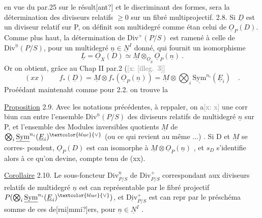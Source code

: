 \documentclass[11pt]{article}
\newcommand{\scanpage}[1]{\par\bigskip\noindent{\small\sffamily[scan #1]}\par}
\newcommand{\mspage}[1]{{\small\sffamily[p.\,#1]}}
\newcommand{\hand}[1]{\textcolor{blue}{#1}}
\newcommand{\xout}[1]{\textcolor{gray}{[\textsf{x:} #1]}}
\newcommand{\uline}[1]{\underline{#1}}
\newcommand{\unsure}[1]{[#1?]}
\newcommand{\illegible}[1]{[\textsf{illeg.\ #1}]}
\begin{document}
\mspage{108}

\clearpage
\scanpage{25/109}
\mspage{12}

en vue du par.25 sur le résult\unsure{ant} et le discriminant des formes, sera la
détermination des diviseurs relatifs $\geqslant 0$ sur un fibré multiprojectif.
2.8.
Si $\underline{D}$ est un diviseur relatif sur P, on définit son multidegré comme étan
celui de $\underline{O}_P(D)$. Comme plus haut, la détermination de $\mathrm{Div}^{+}(P/S)$ est ramené
à celle de $\mathrm{Div}^{\underline{n}}(P/S)$, pour un multidegré $\underline{n}\in\underline{N}^{I}$ donné, qui fournit un
isomorphisme
\[ \underline{L} =\underline{O}_X(D) \simeq \underline{M} \otimes_{\underline{O}_S} \underline{O}_P(\underline{n}) \ . \]
Or on obtient, grâce au Chap II par.2 (\xout{\illegible{3}}
\[ (xx) \qquad f_*(\underline{D}) = \underline{M} \otimes f_*(\underline{O}_P(\underline{n})) = \underline{M} \otimes \bigotimes_i \underline{\mathrm{Sym}}^{n_i}(\underline{E}_i) \quad . \]
Proéédant maintenaht comme pour 2.2. on trouve la

\uline{Proposition} 2.9. Avec les notations précédentes, à reppaler, on a\xout{x} une
corr biun can entre l'ensemble $\mathrm{Div}^{\underline{n}}(P/S)$ des diviseurs relatifs de
multidegré $\underline{n}$ sur P, et l'ensemble des Modules inversibles quotients $\underline{M}$
de $\bigotimes_i \underline{\mathrm{Sym}}^{n_i}(\underline{E}_i)^{\hand{\vee}}$ (ou ce qui revient au même ...) . Si D et $\underline{M}$ se corres-%
pondent, $\underline{O}_P(D)$ est can isomorphe à $\underline{M}\otimes\underline{O}_P(\underline{n})$ , et $s_D$ s'identifie alors
à ce qu'on devine, compte tenu de (xx).

\uline{Corollaire} 2.10. Le sous-foncteur $\mathrm{Div}^{\underline{n}}_{P/S}$ de $\mathrm{Div}^{+}_{P/S}$ correspondant aux
diviseurs relatifs de multidegré $\underline{n}$ est can représentable par le fibré
projectif $P(\bigotimes_i \underline{\mathrm{Sym}}^{n_i}(\underline{E}_i)^{\hand{\vee}})$, et $\underline{\mathrm{Div}}^{+}_{P/S}$ est can repr par le préschéma
somme de ces de\unsure{rni|mmi}ers, pour $\underline{n}\in\underline{N}^{I}$ .
\end{document}
